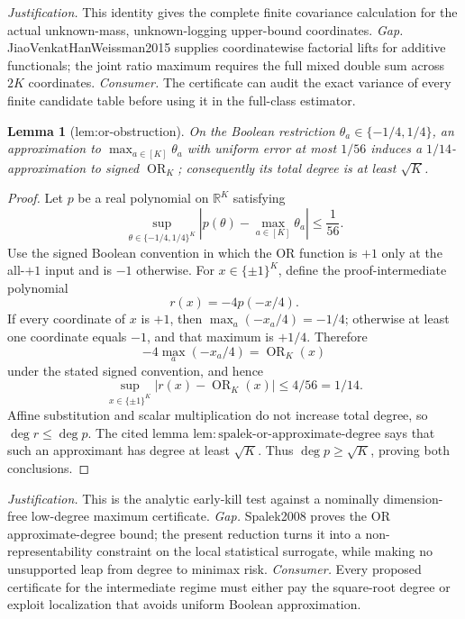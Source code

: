 \documentclass{article}
\newtheorem{lemma}{Lemma}
\begin{document}
\par\smallskip\noindent \textit{Justification.} This identity gives the complete finite covariance calculation for the actual unknown-mass, unknown-logging upper-bound coordinates. \textit{Gap.} JiaoVenkatHanWeissman2015 supplies coordinatewise factorial lifts for additive functionals; the joint ratio maximum requires the full mixed double sum across \(2K\) coordinates. \textit{Consumer.} The certificate can audit the exact variance of every finite candidate table before using it in the full-class estimator.

\begin{lemma}[lem:or-obstruction]\label{lem:or-obstruction}
On the Boolean restriction \(\theta_a\in\{-1/4,1/4\}\), an approximation to \(\max_{a\in[K]}\theta_a\) with uniform error at most \(1/56\) induces a \(1/14\)-approximation to signed \(\operatorname{OR}_K\); consequently its total degree is at least \(\sqrt K\).
\end{lemma}
\begin{proof}
Let \(p\) be a real polynomial on \(\mathbb R^K\) satisfying
\[
 \sup_{\theta\in\{-1/4,1/4\}^K}
 \left|p(\theta)-\max_{a\in[K]}\theta_a\right|\leq\frac1{56}.
\]
Use the signed Boolean convention in which the OR function is \(+1\) only at the all-\(+1\) input and is \(-1\) otherwise.  For \(x\in\{\pm1\}^K\), define the proof-intermediate polynomial
\[
 r(x)=-4p(-x/4).
\]
If every coordinate of \(x\) is \(+1\), then \(\max_a(-x_a/4)=-1/4\); otherwise at least one coordinate equals \(-1\), and that maximum is \(+1/4\).  Therefore
\[
 -4\max_a(-x_a/4)=\operatorname{OR}_K(x)
\]
under the stated signed convention, and hence
\[
 \sup_{x\in\{\pm1\}^K}|r(x)-\operatorname{OR}_K(x)|\leq4/56=1/14.
\]
Affine substitution and scalar multiplication do not increase total degree, so \(\deg r\leq\deg p\).  The cited lemma \(\mathrm{lem{:}spalek\text{-}or\text{-}approximate\text{-}degree}\) says that such an approximant has degree at least \(\sqrt K\).  Thus \(\deg p\geq\sqrt K\), proving both conclusions.
\end{proof}
\par\smallskip\noindent \textit{Justification.} This is the analytic early-kill test against a nominally dimension-free low-degree maximum certificate. \textit{Gap.} Spalek2008 proves the OR approximate-degree bound; the present reduction turns it into a non-representability constraint on the local statistical surrogate, while making no unsupported leap from degree to minimax risk. \textit{Consumer.} Every proposed certificate for the intermediate regime must either pay the square-root degree or exploit localization that avoids uniform Boolean approximation.
\end{document}
